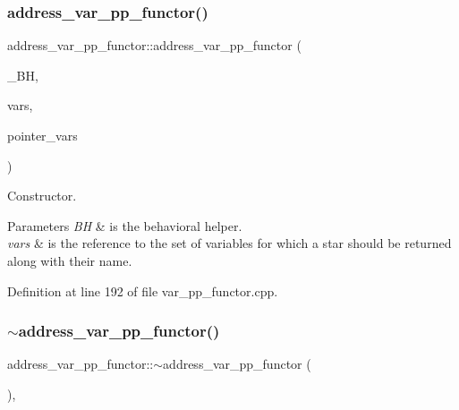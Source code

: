 \subsubsection{\texorpdfstring{address\+\_\+var\+\_\+pp\+\_\+functor()}{address\_var\_pp\_functor()}}
{\footnotesize\ttfamily address\+\_\+var\+\_\+pp\+\_\+functor\+::address\+\_\+var\+\_\+pp\+\_\+functor (\begin{DoxyParamCaption}\item[{const \hyperlink{behavioral__helper_8hpp_aae973b54cac87eef3b27442aa3e1e425}{Behavioral\+Helper\+Const\+Ref}}]{\+\_\+\+BH,  }\item[{const \hyperlink{custom__set_8hpp_a615bc2f42fc38a4bb1790d12c759e86f}{Custom\+Set}$<$ unsigned int $>$}]{vars,  }\item[{const \hyperlink{custom__set_8hpp_a615bc2f42fc38a4bb1790d12c759e86f}{Custom\+Set}$<$ unsigned int $>$}]{pointer\+\_\+vars }\end{DoxyParamCaption})}



Constructor. 


\begin{DoxyParams}{Parameters}
{\em BH} & is the behavioral helper. \\
\hline
{\em vars} & is the reference to the set of variables for which a star should be returned along with their name. \\
\hline
\end{DoxyParams}


Definition at line 192 of file var\+\_\+pp\+\_\+functor.\+cpp.

\mbox{\label{structaddress__var__pp__functor_a084e036b64fd851004f8fe0e7f2282fe}} 
\subsubsection{\texorpdfstring{$\sim$address\+\_\+var\+\_\+pp\+\_\+functor()}{~address\_var\_pp\_functor()}}
{\footnotesize\ttfamily address\+\_\+var\+\_\+pp\+\_\+functor\+::$\sim$address\+\_\+var\+\_\+pp\+\_\+functor (\begin{DoxyParamCaption}{ }\end{DoxyParamCaption})\hspace{0.3cm}{\ttfamily [override]}, {\ttfamily [default]}}



